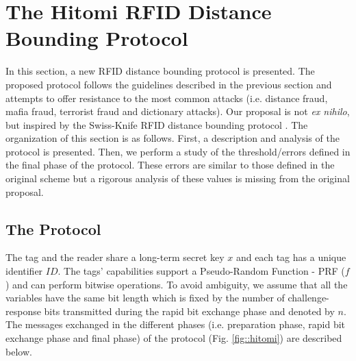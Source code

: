 \documentclass{article}
\begin{document}
\section{The Hitomi RFID Distance Bounding Protocol}

In this section, a new RFID distance bounding protocol is presented. The proposed protocol follows the guidelines described in the previous section and attempts to offer resistance to the most common attacks (i.e. distance fraud, mafia fraud, terrorist fraud and dictionary attacks).  Our proposal is not {\em ex nihilo}, but inspired by the Swiss-Knife RFID distance bounding protocol \cite{KimAKSP-2008-icisc}. The organization of this section is as follows.  First, a description and analysis of the protocol is presented. Then, we perform a study of the threshold/errors defined in the final phase of the protocol. These errors are similar to those defined in the original scheme but a rigorous analysis of these values is missing from the original proposal.

\subsection{The Protocol}
The tag and the reader share a long-term secret key $x$ and each tag has a unique identifier $ID$. The tags' capabilities support a Pseudo-Random Function - PRF ($f$)
and can perform bitwise operations. To avoid ambiguity, we assume that all the variables have the same bit length which is fixed by the number of challenge-response bits transmitted during the rapid bit exchange phase and denoted by $n$.  The messages exchanged in the different phases (i.e. preparation phase, rapid bit exchange phase and final phase) of the protocol (Fig. \ref{fig::hitomi}) are described below.
\end{document}
